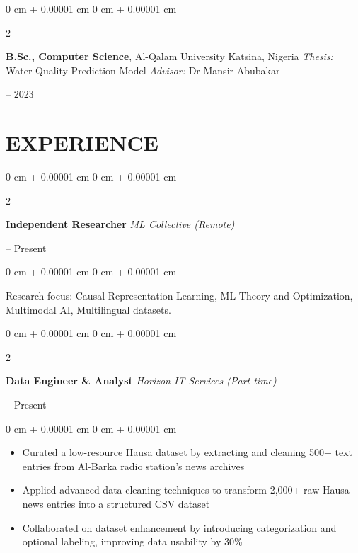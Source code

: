 \documentclass[11pt, letterpaper]{article}
\newenvironment{onecolentry}{
    \begin{adjustwidth}{
        0 cm + 0.00001 cm
    }{
        0 cm + 0.00001 cm
    }
}{
    \end{adjustwidth}
} %
\newenvironment{twocolentry}[2][]{
    \onecolentry
    \def\secondColumn{#2}
    \setcolumnwidth{\fill, 4.5 cm}
    \begin{paracol}{2}
}{
    \switchcolumn \raggedleft \secondColumn
    \end{paracol}
    \endonecolentry
} %
\begin{document}
        \begin{twocolentry}{
            2018 – 2023
        }
            \textbf{B.Sc., Computer Science}, Al-Qalam University Katsina, Nigeria\newline
            \textit{Thesis:} Water Quality Prediction Model \newline
            \textit{Advisor:} Dr Mansir Abubakar
        \end{twocolentry}

    \section{EXPERIENCE}
        \begin{twocolentry}{
            2024 – Present
        }
            \textbf{Independent Researcher} \newline
            \textit{ML Collective (Remote)}
        \end{twocolentry}
        \begin{onecolentry}
            Research focus: Causal Representation Learning, ML Theory and Optimization, Multimodal AI, Multilingual datasets.
        \end{onecolentry}

        \vspace{0.2 cm}
        
        \begin{twocolentry}{
            2023 – Present
        }
            \textbf{Data Engineer \& Analyst} \newline
            \textit{Horizon IT Services (Part-time)}
        \end{twocolentry}
        \begin{onecolentry}
            \begin{itemize}
                \item[-] Curated a low-resource Hausa dataset by extracting and cleaning 500+ text entries from Al-Barka radio station's news archives
                \item[-] Applied advanced data cleaning techniques to transform 2,000+ raw Hausa news entries into a structured CSV dataset
                \item[-] Collaborated on dataset enhancement by introducing categorization and optional labeling, improving data usability by 30\%
            \end{itemize}
        \end{onecolentry}
\end{document}
